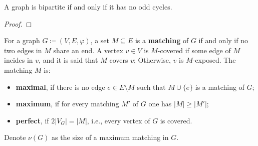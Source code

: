 \begin{theorem}
	A graph is bipartite if and only if it has no odd cycles.
\end{theorem}

\begin{proof}

\end{proof}

\begin{definition}[Matching]
	\label{def:matching}
	For a graph \(G \coloneqq (V, E, \varphi)\), a set \(M \subseteq E\) is a \textbf{matching} of \(G\) if and only if no two edges in \(M\) share an end.
	A vertex \(v \in V\) is \(M\)-covered if some edge of \(M\) incides in \(v\), 
	and it is said that \(M\) covers \(v\);
	Otherwise, \(v\) is \(M\)-exposed.
	The matching \(M\) is:
	\begin{itemize}
		\item 
			\textbf{maximal}, if there is no edge \(e \in E \setminus M\) such that \(M \cup \{e\}\) is a matching of \(G\);

		\item
			\textbf{maximum}, if for every matching \(M'\) of \(G\) one has \(|M| \geq |M'|\);
	
		\item
			\textbf{perfect}, if \(2|V_G| = |M|\), i.e., every vertex of \(G\) is covered.
	\end{itemize}
	Denote \(\nu(G)\) as the size of a maximum matching in \(G\).
\end{definition}

